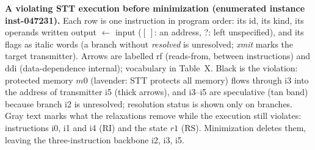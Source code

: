 \textbf{A violating STT execution before minimization (enumerated instance inst-047231).} Each row is one instruction in program order: its id, its kind, its operands written output $\leftarrow$ input ($[\,]$: an address, ?: left unspecified), and its flags as italic words (a branch without \textit{resolved} is unresolved; \textit{xmit} marks the target transmitter). Arrows are labelled rf (reads-from, between instructions) and ddi (data-dependence internal); vocabulary in Table~X. Black is the violation: protected memory $m0$ (lavender: STT protects all memory) flows through i3 into the address of transmitter i5 (thick arrows), and i3--i5 are speculative (tan band) because branch i2 is unresolved; resolution status is shown only on branches. Gray text marks what the relaxations remove while the execution still violates: instructions i0, i1 and i4 (RI) and the state $r1$ (RS). Minimization deletes them, leaving the three-instruction backbone i2, i3, i5.
